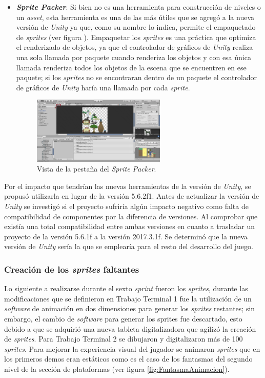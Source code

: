 \begin{itemize}
		\item \textbf{\textit{Sprite Packer}}: Si bien no es una herramienta para 
		construcción de niveles o un \textit{asset}, esta herramienta es una de las 
		más útiles que se agregó a la nueva versión de \textit{Unity} ya que, como 
		su nombre lo indica, permite el empaquetado de \textit{sprites} (ver figura ). 
		Empaquetar 
		los \textit{sprites} es una práctica que optimiza el renderizado de objetos, 
		ya que el controlador de gráficos de \textit{Unity} realiza una sola llamada 
		por paquete cuando renderiza los objetos y con esa única llamada renderiza todos 
		los objetos de la escena que se encuentren en ese paquete; si los 
		\textit{sprites} no se encontraran dentro de un paquete el controlador de 
		gráficos de \textit{Unity} haría una llamada por cada \textit{sprite}.  
			\begin{figure}[h]
    			\centering
    			\includegraphics[width=0.6\textwidth]{05TrabajoReali/imagenes/01.png}
    			\caption{Vista de la pestaña del \textit{Sprite Packer}.}
    			\label{fig:CinemaPantalla}
			\end{figure}
	\end{itemize}
	Por el impacto que tendrían las nuevas herramientas de la versión de 
	\textit{Unity}, se propusó utilizarla en lugar de la versión 5.6.2f1. Antes 
	de actualizar la versión de \textit{Unity} se investigó si el proyecto sufriría 
	algún impacto negativo como falta de compatibilidad de componentes por la 
	diferencia de versiones. Al comprobar que existía una total compatibilidad 
	entre ambas versiones en cuanto a trasladar un proyecto de la versión 5.6.1f 
	a la versión 2017.3.1f. Se determinó que la nueva versión de \textit{Unity} 
	sería la que se emplearía para el resto del desarrollo del juego.

\subsubsection{Creación de los \textit{sprites} faltantes}
Lo siguiente a realizarse durante el sexto \textit{sprint} fueron los \textit{sprites}, 
durante las modificaciones que se definieron en Trabajo Terminal 1 fue la 
utilización de un \textit{software} de animación en dos dimensiones para generar 
los \textit{sprites} restantes; sin embargo, el cambio de \textit{software} para 
generar los sprites fue descartado, esto debido a que se adquirió una nueva 
tableta digitalizadora que agilizó la creación de \textit{sprites}. Para Trabajo 
Terminal 2 se dibujaron y digitalizaron más de 100 \textit{sprites}. Para mejorar 
la experiencia visual del jugador se animaron \textit{sprites} que en los primeros 
demos eran estáticos como es el caso de los fantasmas del segundo nivel de la 
sección de plataformas (ver figura \ref{fig:FantasmaAnimacion}). 

